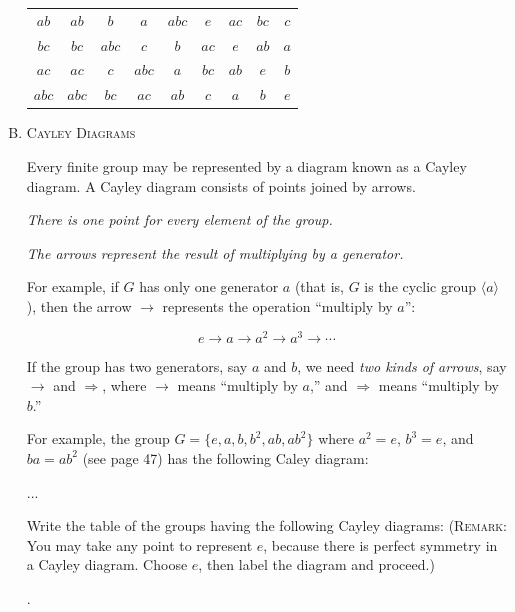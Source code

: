 \documentclass[twoside]{amsart}
\begin{document}
\begin{enumerate}[A.]
\begin{center}
\begin{tabular}{c|cccccccc}
    $ab$ & $ab$ & $b$ & $a$ & $abc$ & $e$ & $ac$ & $bc$ & $c$ \\

    $bc$ & $bc$ & $abc$ & $c$ & $b$ & $ac$ & $e$ & $ab$ & $a$ \\

    $ac$ & $ac$ & $c$ & $abc$ & $a$ & $bc$ & $ab$ & $e$ & $b$ \\

    $abc$ & $abc$ & $bc$ & $ac$ & $ab$ & $c$ & $a$ & $b$ & $e$ 
    \end{tabular}
    \end{center}

    \item \textsc{Cayley Diagrams}

    \noindent Every finite group may be represented by a diagram known
    as a Cayley diagram. A Cayley diagram consists of points joined by arrows.
    \begin{center}
        \textit{There is one point for every element of the group.}
    \end{center}
    \begin{center}
      \textit{The arrows represent the result of multiplying by a generator.}
    \end{center}

    \noindent For example, if $G$ has only one generator $a$ (that is, $G$
    is the cyclic group $\langle a \rangle$), then the arrow $\to$
    represents the operation ``multiply by $a$'':

    \[
       e \to a \to a^2 \to a^3 \to \cdots
    \]

    \noindent If the group has two generators, say $a$ and $b$, we need
    \emph{two kinds of arrows}, say $\to$ and $\Rightarrow$, where 
    $\to$ means ``multiply by $a$,'' and $\Rightarrow$ means
    ``multiply by $b$.''

    For example, the group $G = \{e,a,b,b^2,ab,ab^2\}$ where $a^2=e$,
    $b^3=e$, and $ba=ab^2$ (see page 47) has the following Caley diagram:

    ...

    Write the table of the groups having the following Cayley diagrams:
    (\textsc{Remark}: You may take any point to represent $e$, because
    there is perfect symmetry in a Cayley diagram. Choose $e$, then
    label the diagram and proceed.)
    

    . 


\end{enumerate}
\end{document}
